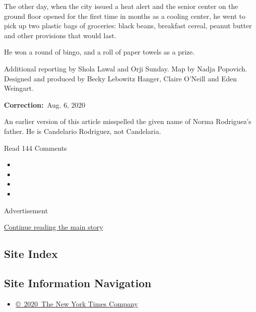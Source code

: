 The other day, when the city issued a heat alert and the senior center
on the ground floor opened for the first time in months as a cooling
center, he went to pick up two plastic bags of groceries: black beans,
breakfast cereal, peanut butter and other provisions that would last.

He won a round of bingo, and a roll of paper towels as a prize.

Additional reporting by Shola Lawal and Orji Sunday. Map by Nadja
Popovich. Designed and produced by Becky Lebowitz Hanger, Claire O'Neill
and Eden Weingart.

\textbf{Correction:}~Aug. 6, 2020

An earlier version of this article misspelled the given name of Norma
Rodriguez's father. He is Candelario Rodriguez, not Candelaria.

Read 144 Comments

\begin{itemize}
\item
\item
\item
\item
\end{itemize}

Advertisement

\protect\hyperlink{after-bottom}{Continue reading the main story}

\hypertarget{site-index}{%
\subsection{Site Index}\label{site-index}}

\hypertarget{site-information-navigation}{%
\subsection{Site Information
Navigation}\label{site-information-navigation}}

\begin{itemize}
\tightlist
\item
  \href{https://help.nytimes3xbfgragh.onion/hc/en-us/articles/115014792127-Copyright-notice}{©~2020~The
  New York Times Company}
\end{itemize}

